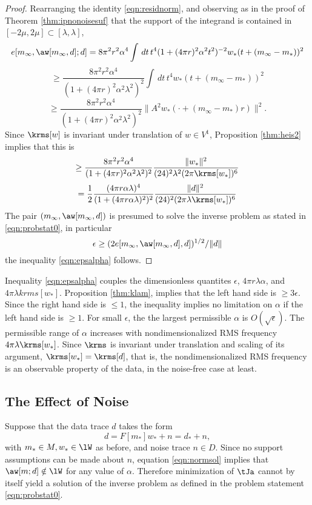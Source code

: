 \begin{proof}
  Rearranging the identity \ref{eqn:residnorm}, and observing as in
  the proof of Theorem \ref{thm:ipnonoisesuf} that the support of the
  integrand is contained in $[-2\mu, 2\mu] \subset [\lambda,\lambda]$,
  \[
  e[m_{\infty},\aw[m_{\infty},d];d] 
= 8 \pi^2 r^2 \alpha^4\int\,dt\,t^4(1+(4\pi r)^2 \alpha^2 t^2)^{-2}w_*(t+(m_{\infty}-m_*))^2
\]
\[
  \ge \frac{8\pi^2r^2\alpha^4}{(1+(4\pi r)^2 \alpha^2
    \lambda^2)^{2}}\int\,dt\,t^4w_*(t+(m_{\infty}-m_*))^2
\]
\begin{equation}
  \label{eqn:residnormbis}
  \ge \frac{8\pi^2r^2\alpha^4}{(1+(4\pi r)^2 \alpha^2
    \lambda^2)^{2}}\|A^2w_*(\cdot + (m_{\infty}-m_*)r)\|^2.
 \end{equation}
Since $\krms[w]$ is invariant under translation of $w \in V^1$,
Proposition \ref{thm:heis2} implies that this is
\[
  \ge \frac{8\pi^2r^2\alpha^4}{(1+(4\pi r)^2 \alpha^2
    \lambda^2)^{2}}\frac{\|w_*\|^2}{(24)^2 \lambda^2 (2\pi\krms[w_*])^6}
\]
\[
  = \frac{1}{2}\frac{(4\pi r\alpha\lambda)^4}{(1+(4\pi r \alpha
    \lambda)^2)^{2}}\frac{\|d\|^2}{(24)^2 (2\pi
    \lambda \krms[w_*])^6}
\]
The pair $(m_{\infty}, \aw[m_{\infty},d])$ is presumed to solve the inverse
problem as stated in \ref{eqn:probstat0}, in particular
\[
  \epsilon \ge (2 e[m_{\infty}, \aw[m_{\infty},d],d])^{1/2}/\|d\|
\]
the inequality \ref{eqn:epsalpha} follows.

\end{proof}

Inequality \ref{eqn:epsalpha} couples the dimensionless quantites
$\epsilon$,  $4\pi r \lambda \alpha$, and $4 \pi \lambda
krms[w_*]$. Proposition \ref{thm:klam}, implies that the left
hand side is $\ge 3\epsilon$. Since the right hand side is $\le 1$,
the inequality implies no limitation on $\alpha$ if the left hand side
is $\ge 1$. For small $\epsilon$, the the largest permissible $\alpha$
is $O(\sqrt{\epsilon})$. The permissible range of $\alpha$ increases with
nondimensionalized RMS frequency $4\pi \lambda \krms[w_*]$. Since
$\krms$ is invariant under translation and scaling of its argument,
$\krms[w_*]=\krms[d]$, that is, the nondimensionalized RMS frequency
is an observable property of the data, in the noise-free case at
least.

\subsection{The Effect of Noise}
Suppose that the data trace $d$ takes the form
\begin{equation}
  \label{eqn:defdatanoisy}
  d = F[m_*]w_* + n = d_*+n,
\end{equation}
with $m_* \in M, w_* \in \lW$ as before, and noise trace $n \in
D$. Since no support assumptions can be made about $n$, equation
\ref{eqn:normsol} implies that $\aw[m;d] \notin \lW$ for any value of
$\alpha$.  Therefore minimization of $\tJa$ cannot by itself yield a
solution of the inverse problem as defined in the problem statement
\ref{eqn:probstat0}.

